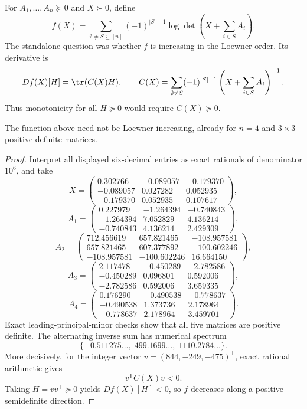 For $A_1,\ldots,A_n\succeq0$ and $X\succ0$, define
\[
f(X)=\sum_{\emptyset\ne S\subseteq[n]}(-1)^{|S|+1}
\log\det\left(X+\sum_{i\in S}A_i\right).
\]
The standalone question was whether $f$ is increasing in the Loewner order.  Its derivative is
\[
Df(X)[H]=\tr(C(X)H),\qquad
C(X)=\sum_{\emptyset\ne S}(-1)^{|S|+1}
\left(X+\sum_{i\in S}A_i\right)^{-1}.
\]
Thus monotonicity for all $H\succeq0$ would require $C(X)\succeq0$.

\begin{theorem}\label{thm:logdet}
The function above need not be Loewner-increasing, already for $n=4$ and $3\times3$ positive definite matrices.
\end{theorem}
\begin{proof}
Interpret all displayed six-decimal entries as exact rationals of denominator $10^6$, and take
\[
X=\begin{pmatrix}
0.302766&-0.089057&-0.179370\\
-0.089057&0.027282&0.052935\\
-0.179370&0.052935&0.107617
\end{pmatrix},
\]
\[
A_1=\begin{pmatrix}
0.227979&-1.264394&-0.740843\\
-1.264394&7.052829&4.136214\\
-0.740843&4.136214&2.429309
\end{pmatrix},
\]
\[
A_2=\begin{pmatrix}
712.456619&657.821465&-108.957581\\
657.821465&607.377892&-100.602246\\
-108.957581&-100.602246&16.664150
\end{pmatrix},
\]
\[
A_3=\begin{pmatrix}
2.117478&-0.450289&-2.782586\\
-0.450289&0.096801&0.592006\\
-2.782586&0.592006&3.659335
\end{pmatrix},
\]
\[
A_4=\begin{pmatrix}
0.176290&-0.490538&-0.778637\\
-0.490538&1.373736&2.178964\\
-0.778637&2.178964&3.459701
\end{pmatrix}.
\]
Exact leading-principal-minor checks show that all five matrices are positive definite.  The alternating inverse sum has numerical spectrum
\[
\{-0.511275\ldots,\;499.1699\ldots,\;1110.2784\ldots\}.
\]
More decisively, for the integer vector $v=(844,-249,-475)^{\mathsf T}$, exact rational arithmetic gives
\[
v^{\mathsf T}C(X)v<0.
\]
Taking $H=vv^{\mathsf T}\succeq0$ yields $Df(X)[H]<0$, so $f$ decreases along a positive semidefinite direction.
\end{proof}
